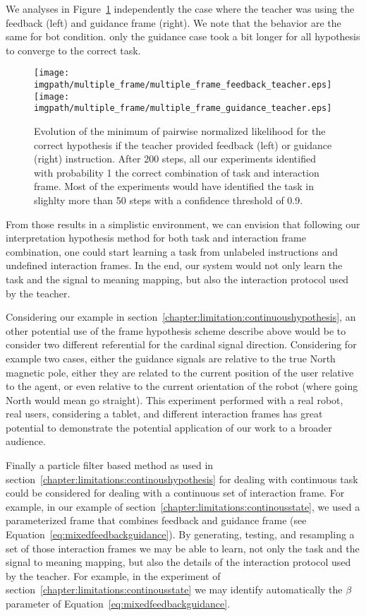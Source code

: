 We analyses in Figure~\ref{fig:multipleframefeedbackvsguidance} independently the case where the teacher was using the feedback (left) and guidance frame (right). We note that the behavior are the same for bot condition. only the guidance case took a bit longer for all hypothesis to converge to the correct task.

\begin{figure}[!ht]
\centering
\texttt{[image: \\imgpath/multiple\_frame/multiple\_frame\_feedback\_teacher.eps]}
\texttt{[image: \\imgpath/multiple\_frame/multiple\_frame\_guidance\_teacher.eps]}
\caption{Evolution of the minimum of pairwise normalized likelihood for the correct hypothesis if the teacher provided feedback (left) or guidance (right) instruction. After 200 steps, all our experiments identified with probability 1 the correct combination of task and interaction frame. Most of the experiments would have identified the task in slighlty more than 50 steps with a confidence threshold of 0.9.}
\label{fig:multipleframefeedbackvsguidance}
\end{figure} 


From those results in a simplistic environment, we can envision that following our interpretation hypothesis method for both task and interaction frame combination, one could start learning a task from unlabeled instructions and undefined interaction frames. In the end, our system would not only learn the task and the signal to meaning mapping, but also the interaction protocol used by the teacher.

Considering our example in section~\ref{chapter:limitation:continuoushypothesis}, an other potential use of the frame hypothesis scheme describe above would be to consider two different referential for the cardinal signal direction. Considering for example two cases, either the guidance signals are relative to the true North magnetic pole, either they are related to the current position of the user relative to the agent, or even relative to the current orientation of the robot (where going North would mean go straight). This experiment performed with a real robot, real users, considering a tablet, and different interaction frames has great potential to demonstrate the potential application of our work to a broader audience.

Finally a particle filter based method as used in section~\ref{chapter:limitations:continoushypothesis} for dealing with continuous task could be considered for dealing with a continuous set of interaction frame. For example, in our example of section~\ref{chapter:limitations:continousstate}, we used a parameterized frame that combines feedback and guidance frame (see Equation~\ref{eq:mixedfeedbackguidance}). By generating, testing, and resampling a set of those interaction frames we may be able to learn, not only the task and the signal to meaning mapping, but also the details of the interaction protocol used by the teacher. For example, in the experiment of section~\ref{chapter:limitations:continousstate} we may identify automatically the $\beta$ parameter of Equation~\ref{eq:mixedfeedbackguidance}.
